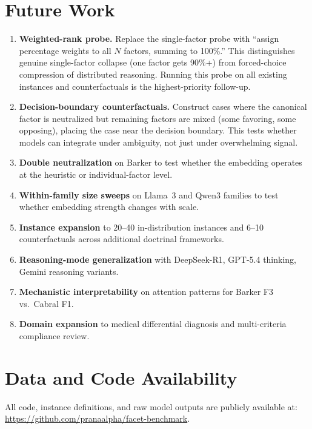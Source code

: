 \documentclass[11pt,twocolumn]{article}
\begin{document}
\section{Future Work}

\begin{enumerate}
\item \textbf{Weighted-rank probe.} Replace the single-factor probe with ``assign percentage weights to all $N$ factors, summing to 100\%.'' This distinguishes genuine single-factor collapse (one factor gets 90\%+) from forced-choice compression of distributed reasoning. Running this probe on all existing instances and counterfactuals is the highest-priority follow-up.
\item \textbf{Decision-boundary counterfactuals.} Construct cases where the canonical factor is neutralized but remaining factors are mixed (some favoring, some opposing), placing the case near the decision boundary. This tests whether models can integrate under ambiguity, not just under overwhelming signal.
\item \textbf{Double neutralization} on Barker to test whether the embedding operates at the heuristic or individual-factor level.
\item \textbf{Within-family size sweeps} on Llama~3 and Qwen3 families to test whether embedding strength changes with scale.
\item \textbf{Instance expansion} to 20--40 in-distribution instances and 6--10 counterfactuals across additional doctrinal frameworks.
\item \textbf{Reasoning-mode generalization} with DeepSeek-R1, GPT-5.4 thinking, Gemini reasoning variants.
\item \textbf{Mechanistic interpretability} on attention patterns for Barker F3 vs.\ Cabral F1.
\item \textbf{Domain expansion} to medical differential diagnosis and multi-criteria compliance review.
\end{enumerate}

\section{Data and Code Availability}

All code, instance definitions, and raw model outputs are publicly available at: \url{https://github.com/pranaalpha/facet-benchmark}.
\end{document}
